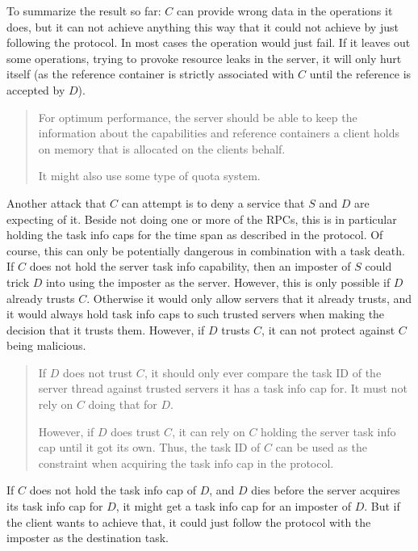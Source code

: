 \documentclass[9pt,a4paper]{extarticle}
\newenvironment{comment}{\footnotesize \begin{quote}}{\end{quote}}
\begin{document}
To summarize the result so far: $C$ can provide wrong data in the
operations it does, but it can not achieve anything this way that it
could not achieve by just following the protocol.  In most cases the
operation would just fail.  If it leaves out some operations, trying
to provoke resource leaks in the server, it will only hurt itself (as
the reference container is strictly associated with $C$ until the
reference is accepted by $D$).

\begin{comment}
  For optimum performance, the server should be able to keep the
  information about the capabilities and reference containers a client
  holds on memory that is allocated on the clients behalf.
  
  It might also use some type of quota system.
\end{comment}

Another attack that $C$ can attempt is to deny a service that $S$ and
$D$ are expecting of it.  Beside not doing one or more of the RPCs,
this is in particular holding the task info caps for the time span as
described in the protocol.  Of course, this can only be potentially
dangerous in combination with a task death.  If $C$ does not hold the
server task info capability, then an imposter of $S$ could trick $D$
into using the imposter as the server.  However, this is only possible
if $D$ already trusts $C$.  Otherwise it would only allow servers that
it already trusts, and it would always hold task info caps to such
trusted servers when making the decision that it trusts them.
However, if $D$ trusts $C$, it can not protect against $C$ being
malicious.

\begin{comment}
  If $D$ does not trust $C$, it should only ever compare the task ID
  of the server thread against trusted servers it has a task info cap
  for.  It must not rely on $C$ doing that for $D$.
  
  However, if $D$ does trust $C$, it can rely on $C$ holding the
  server task info cap until it got its own.  Thus, the task ID of $C$
  can be used as the constraint when acquiring the task info cap in
  the protocol.
\end{comment}

If $C$ does not hold the task info cap of $D$, and $D$ dies before the
server acquires its task info cap for $D$, it might get a task info
cap for an imposter of $D$.  But if the client wants to achieve that,
it could just follow the protocol with the imposter as the destination
task.
\end{document}
